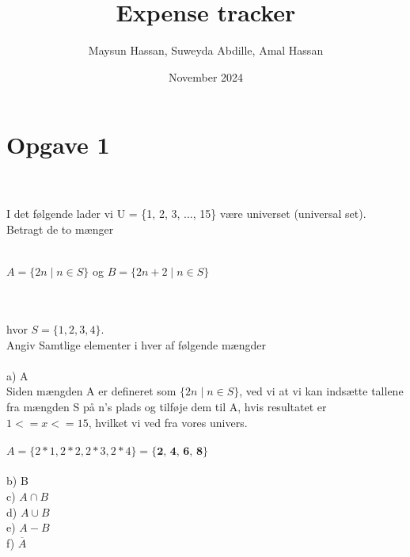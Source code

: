 \documentclass{article}
\title{Expense tracker}
\author{Maysun Hassan, Suweyda Abdille, Amal Hassan}
\date{November 2024}
\begin{document}


\tableofcontents
\thispagestyle{empty}
\newpage
\setcounter{page}{1}
 
 

\section*{Opgave 1}

\\
\\
I det følgende lader vi U = \{1, 2, 3, ..., 15\} være universet (universal set).
\\
Betragt de to mænger
\\
\\
\begin{center}
    \( A = \{ 2n \mid n \in S \} \) og \( B = \{ 2n + 2 \mid n \in S \} \)
\end{center}
\\
\\
hvor \(S = \{1, 2, 3, 4\}.\)
\\
Angiv Samtlige elementer i hver af følgende mængder
\\
\\
a) A\\
Siden mængden A er defineret som \(\{ 2n \mid n \in S \}\), ved vi at vi kan indsætte tallene fra mængden S på n's plads og tilføje dem til A, hvis resultatet er \(1 <= x <= 15\), hvilket vi ved fra vores univers.
\\
\\
\(A = \{2*1, 2*2, 2*3, 2*4\} = \textbf{\{2, 4, 6, 8\}}\)
\\
\\
b) B\\
c) \(A \cap B\)\\
d) \(A \cup B\)\\
e) \(A - B\)\\
f) \(\overline{A}\)
\\
\\




\end{document}
